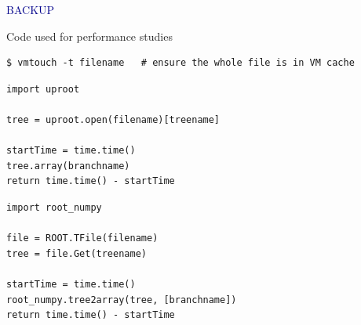 \documentclass[aspectratio=169]{beamer}
\begin{document}



\begin{frame}{}
\begin{center}
\Huge \textcolor{darkblue}{BACKUP}
\end{center}
\end{frame}

\begin{frame}[fragile]{Code used for performance studies}
\vspace{0.25 cm}
\small

\begin{verbatim}
$ vmtouch -t filename   # ensure the whole file is in VM cache
\end{verbatim}

\begin{verbatim}
import uproot

tree = uproot.open(filename)[treename]

startTime = time.time()
tree.array(branchname)
return time.time() - startTime
\end{verbatim}

\begin{verbatim}
import root_numpy

file = ROOT.TFile(filename)
tree = file.Get(treename)

startTime = time.time()
root_numpy.tree2array(tree, [branchname])
return time.time() - startTime
\end{verbatim}

\end{frame}
\end{document}

